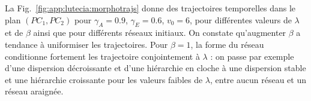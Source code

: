 La Fig.~\ref{fig:app:lutecia:morphotrajs} donne des trajectoires temporelles dans le plan $(PC_1,PC_2)$ pour $\gamma_A = 0.9$, $\gamma_E = 0.6$, $v_0 = 6$, pour différentes valeurs de $\lambda$ et de $\beta$ ainsi que pour différents réseaux initiaux. On constate qu'augmenter $\beta$ a tendance à uniformiser les trajectoires. Pour $\beta = 1$, la forme du réseau conditionne fortement les trajectoire conjointement à $\lambda$ : on passe par exemple d'une dispersion décroissante et d'une hiérarchie en cloche à une dispersion stable et une hiérarchie croissante pour les valeurs faibles de $\lambda$, entre aucun réseau et un réseau araignée.




